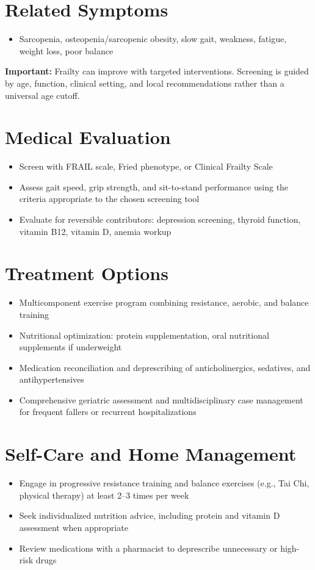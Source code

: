 \section*{Related Symptoms}
\begin{itemize}
  \item Sarcopenia, osteopenia/sarcopenic obesity, slow gait, weakness, fatigue, weight loss, poor balance
\end{itemize}
\textbf{Important:} Frailty can improve with targeted interventions. Screening is guided by age, function, clinical setting, and local recommendations rather than a universal age cutoff.

\section*{Medical Evaluation}
\begin{itemize}
  \item Screen with FRAIL scale, Fried phenotype, or Clinical Frailty Scale
  \item Assess gait speed, grip strength, and sit-to-stand performance using the criteria appropriate to the chosen screening tool
  \item Evaluate for reversible contributors: depression screening, thyroid function, vitamin B12, vitamin D, anemia workup
\end{itemize}

\section*{Treatment Options}
\begin{itemize}
  \item Multicomponent exercise program combining resistance, aerobic, and balance training
  \item Nutritional optimization: protein supplementation, oral nutritional supplements if underweight
  \item Medication reconciliation and deprescribing of anticholinergics, sedatives, and antihypertensives
  \item Comprehensive geriatric assessment and multidisciplinary case management for frequent fallers or recurrent hospitalizations
\end{itemize}

\section*{Self-Care and Home Management}
\begin{itemize}
  \item Engage in progressive resistance training and balance exercises (e.g., Tai Chi, physical therapy) at least 2--3 times per week
  \item Seek individualized nutrition advice, including protein and vitamin D assessment when appropriate
  \item Review medications with a pharmacist to deprescribe unnecessary or high-risk drugs
\end{itemize}

